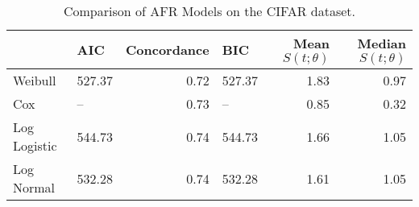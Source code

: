 \begin{table*}
\caption{Comparison of AFR Models on the CIFAR dataset.}
\label{tab:cifar}
\begin{tabular}{llrlrr}
\toprule
 & AIC & Concordance & BIC & Mean $S(t;\theta)$ & Median $S(t; \theta)$ \\
\midrule
Weibull & 527.37 & 0.72 & 527.37 & 1.83 & 0.97 \\
Cox & -- & 0.73 & -- & 0.85 & 0.32 \\
Log Logistic & 544.73 & 0.74 & 544.73 & 1.66 & 1.05 \\
Log Normal & 532.28 & 0.74 & 532.28 & 1.61 & 1.05 \\
\bottomrule
\end{tabular}
\end{table*}
